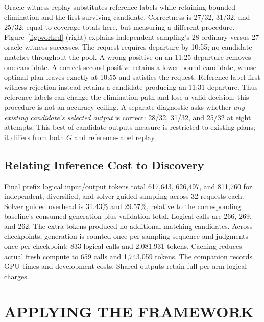 \documentclass[a4paper,twoside]{article}
\begin{document}
Oracle witness replay substitutes reference labels while retaining bounded elimination and the first surviving candidate. Correctness is 27/32, 31/32, and 25/32: equal to coverage totals here, but measuring a different procedure.
Figure~\ref{fig:worked} (right) explains independent sampling's 28 ordinary versus 27 oracle witness successes. The request requires departure by 10:55; no candidate matches throughout the pool. A wrong positive on an 11:25 departure removes one candidate. A correct second positive retains a lower-bound candidate, whose optimal plan leaves exactly at 10:55 and satisfies the request. Reference-label first witness rejection instead retains a candidate producing an 11:31 departure. Thus reference labels can change the elimination path and lose a valid decision: this procedure is not an accuracy ceiling.
A separate diagnostic asks whether \emph{any existing candidate's selected output} is correct: 28/32, 31/32, and 25/32 at eight attempts. This best-of-candidate-outputs measure is restricted to existing plans; it differs from both $G$ and reference-label replay.

\subsection{Relating Inference Cost to Discovery}

Final prefix logical input/output tokens total 617,643, 626,497, and 811,760 for independent, diversified, and solver-guided sampling across 32 requests each. Solver guided overhead is 31.43\% and 29.57\%, relative to the corresponding baseline's consumed generation plus validation total. Logical calls are 266, 269, and 262. The extra tokens produced no additional matching candidates.
Across checkpoints, generation is counted once per sampling sequence and judgments once per checkpoint: 833 logical calls and 2,081,931 tokens. Caching reduces actual fresh compute to 659 calls and 1,743,059 tokens. The companion records GPU times and development costs. Shared outputs retain full per-arm logical charges.



\section{\uppercase{Applying the Framework}}
\label{sec:recommendations}
\end{document}
